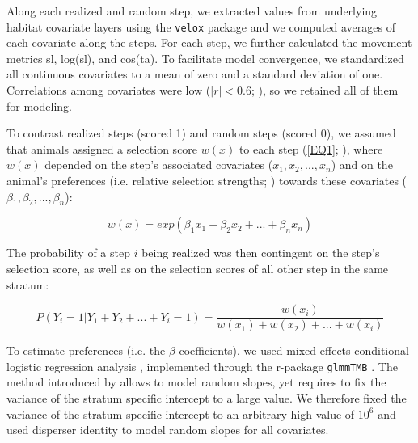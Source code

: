 \documentclass[abstract=on,10pt,a4paper,bibliography=totocnumbered]{article}
\begin{document}
Along each realized and random step, we extracted values from underlying habitat
covariate layers using the {\tt velox} package \citep{Hunziker.2021} and we
computed averages of each covariate along the steps. For each step, we further
calculated the movement metrics \textsf{sl}, \textsf{log(sl)}, and
\textsf{cos(ta)}. To facilitate model convergence, we standardized all
continuous covariates to a mean of zero and a standard deviation of one.
Correlations among covariates were low (\(|r| < 0.6\); \citealp{Latham.2011}),
so we retained all of them for modeling.

To contrast realized steps (scored 1) and random steps (scored 0), we assumed
that animals assigned a selection score \(w(x)\) to each step (\ref{EQ1};
\citealp{Fortin.2005}), where \(w(x)\) depended on the step's associated
covariates (\(x_1, x_2, ..., x_n\)) and on the animal's preferences (i.e.
relative selection strengths; \citealp{Avgar.2017}) towards these covariates
(\(\beta_1, \beta_2, ..., \beta_n\)):

\begin{equation}
\label{EQ1}
  w(x) = exp(\beta_1 x_1 + \beta_2 x_2 + ... + \beta_n x_n)
\end{equation}

\noindent The probability of a step \(i\) being realized was then contingent on
the step's selection score, as well as on the selection scores of all other step
in the same stratum:

\begin{equation}
\label{EQ2}
  P(Y_{i} = 1 | Y_{1} + Y_{2} + ... + Y_{i} = 1) =
  \frac{w(x_{i})}{w(x_{1}) + w(x_{2}) + ... + w(x_{i})}
\end{equation}

\noindent To estimate preferences (i.e. the \(\beta\)-coefficients), we used
mixed effects conditional logistic regression analysis \citep{Muff.2020},
implemented through the r-package {\tt glmmTMB} \citep{Brooks.2017}. The method
introduced by \cite{Muff.2020} allows to model random slopes, yet requires to
fix the variance of the stratum specific intercept to a large value. We
therefore fixed the variance of the stratum specific intercept to an arbitrary
high value of \(10 ^ 6\) and used disperser identity to model random slopes for
all covariates.
\end{document}
